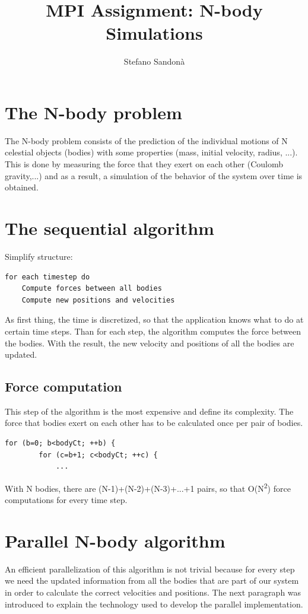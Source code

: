 \documentclass[a4paper]{article}
\begin{document}
\title{MPI Assignment: N-body Simulations}
\author{Stefano Sandonà}
\date{}
		
\maketitle

\section{The N-body problem}
\label{sec:nbody_problem}
The N-body problem consists of the prediction of the individual motions of N celestial objects (bodies) with some properties (mass, initial velocity, radius, ...). This is done by measuring the force that they exert on each other (Coulomb gravity,...) and as a result, a simulation of the behavior of the system over time is obtained.  

\section{The sequential algorithm}
\label{sec:seq_algo}
Simplify structure:
\begin{lstlisting}
for each timestep do
	Compute forces between all bodies
	Compute new positions and velocities
\end{lstlisting}

As first thing, the time is discretized, so that the application knows what to do at certain time steps. Than for each step, the algorithm computes the force between the bodies. With the result, the new velocity and positions of all the bodies are updated.

\subsection{Force computation}
\label{sec:force_comp_seq}
This step of the algorithm is the most expensive and define its complexity.
The force that bodies exert on each other has to be calculated once per pair of bodies.
\begin{lstlisting}
for (b=0; b<bodyCt; ++b) {
		for (c=b+1; c<bodyCt; ++c) {
			...
\end{lstlisting}
With N bodies, there are (N-1)+(N-2)+(N-3)+...+1 pairs, so that O(N\textsuperscript{2}) force computations for every time step.

\section{Parallel N-body algorithm}
\label{sec:par}
An efficient parallelization of this algorithm is not trivial because for every step we need the updated information from all the bodies that are part of our system in order to calculate the correct velocities and positions. The next paragraph was introduced to explain the technology used to develop the parallel implementation.
\end{document}
